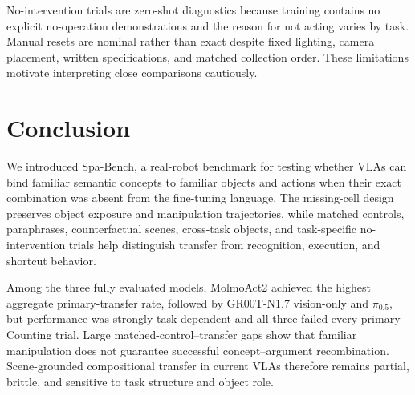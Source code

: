 \documentclass[conference]{IEEEtran}
\begin{document}
No-intervention trials are zero-shot diagnostics because training contains
no explicit no-operation demonstrations and the reason for not acting varies
by task. Manual resets are nominal rather than exact despite fixed lighting,
camera placement, written specifications, and matched collection order.
These limitations motivate interpreting close comparisons cautiously.

\section{Conclusion}

We introduced Spa-Bench, a real-robot benchmark for testing whether VLAs can bind familiar semantic concepts to familiar objects and actions when their exact combination was absent from the fine-tuning language. The missing-cell design preserves object exposure and manipulation trajectories, while matched controls, paraphrases, counterfactual scenes, cross-task objects, and task-specific no-intervention trials help distinguish transfer from recognition, execution, and shortcut behavior.

Among the three fully evaluated models, MolmoAct2 achieved the highest
aggregate primary-transfer rate, followed by GR00T-N1.7 vision-only and
$\pi_{0.5}$, but performance was strongly task-dependent and all three
failed every primary Counting trial. Large matched-control--transfer gaps
show that familiar manipulation does not guarantee successful
concept--argument recombination. Scene-grounded compositional transfer in
current VLAs therefore remains partial, brittle, and sensitive to task
structure and object role.


\end{document}
